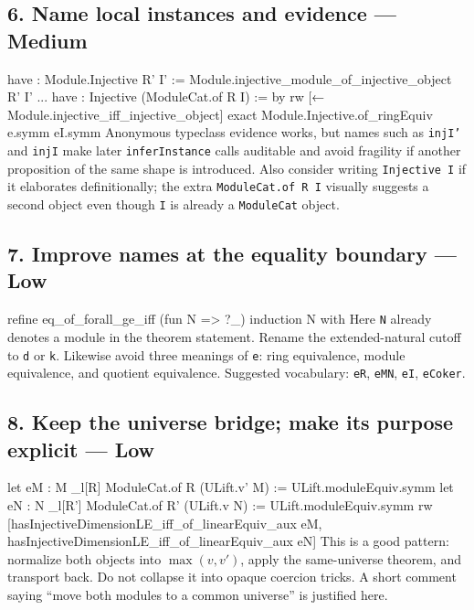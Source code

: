 \documentclass[10pt]{article}
\newenvironment{lean}{\Verbatim[fontsize=\scriptsize,frame=single,framesep=2mm,formatcom=\leanfont]}{\endVerbatim}
\newcommand{\med}{\textbf{Medium}}
\newcommand{\low}{\textbf{Low}}
\begin{document}
\subsection*{6. Name local instances and evidence --- \med}
\begin{lean}
have : Module.Injective R' I' :=
  Module.injective_module_of_injective_object R' I'
...
have : Injective (ModuleCat.of R I) := by
  rw [← Module.injective_iff_injective_object]
  exact Module.Injective.of_ringEquiv e.symm eI.symm
\end{lean}
Anonymous typeclass evidence works, but names such as \texttt{injI'} and \texttt{injI} make later
\texttt{inferInstance} calls auditable and avoid fragility if another proposition of the same shape is
introduced. Also consider writing \texttt{Injective I} if it elaborates definitionally; the extra
\texttt{ModuleCat.of R I} visually suggests a second object even though \texttt{I} is already a
\texttt{ModuleCat} object.

\subsection*{7. Improve names at the equality boundary --- \low}
\begin{lean}
refine eq_of_forall_ge_iff (fun N => ?_)
induction N with
\end{lean}
Here \texttt{N} already denotes a module in the theorem statement. Rename the extended-natural cutoff
to \texttt{d} or \texttt{k}. Likewise avoid three meanings of \texttt{e}: ring equivalence, module
equivalence, and quotient equivalence. Suggested vocabulary: \texttt{eR}, \texttt{eMN},
\texttt{eI}, \texttt{eCoker}.

\subsection*{8. Keep the universe bridge; make its purpose explicit --- \low}
\begin{lean}
let eM : M \simeq_l[R] ModuleCat.of R (ULift.{v'} M) :=
  ULift.moduleEquiv.symm
let eN : N \simeq_l[R'] ModuleCat.of R' (ULift.{v} N) :=
  ULift.moduleEquiv.symm
rw [hasInjectiveDimensionLE_iff_of_linearEquiv_aux eM,
  hasInjectiveDimensionLE_iff_of_linearEquiv_aux eN]
\end{lean}
This is a good pattern: normalize both objects into \(\max(v,v')\), apply the same-universe theorem,
and transport back. Do not collapse it into opaque coercion tricks. A short comment saying
``move both modules to a common universe'' is justified here.
\end{document}
